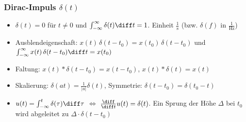 \begin{sectionbox}
    \subsubsection{Dirac-Impuls $\delta(t)$}
    \begin{itemize}
        \item $\delta(t)=0$ für $t\neq0$ und $\int_{-\infty}^{\infty}\delta(t)\diff t=1$. Einheit $\frac{1}{\mathrm{s}}$ (bzw. $\delta(f)$ in $\frac{1}{\mathrm{Hz}}$)
        \item Ausblendeigenschaft: $x(t)\,\delta(t-t_0)=x(t_0)\,\delta(t-t_0)$ und $\int_{-\infty}^{\infty}x(t)\,\delta(t-t_0)\diff t=x(t_0)$
        \item Faltung: $x(t)*\delta(t-t_0)=x(t-t_0)$, \; $x(t)*\delta(t)=x(t)$
        \item Skalierung: $\delta(at)=\frac{1}{|a|}\delta(t)$, \; Symmetrie: $\delta(t-t_0)=\delta(t_0-t)$
        \item $u(t)=\int_{-\infty}^{t}\delta(\tau)\diff\tau$ $\Leftrightarrow$ $\frac{\diff}{\diff t}u(t)=\delta(t)$. Ein Sprung der Höhe $\Delta$ bei $t_0$ wird abgeleitet zu $\Delta\cdot\delta(t-t_0)$
    \end{itemize}
\end{sectionbox}


